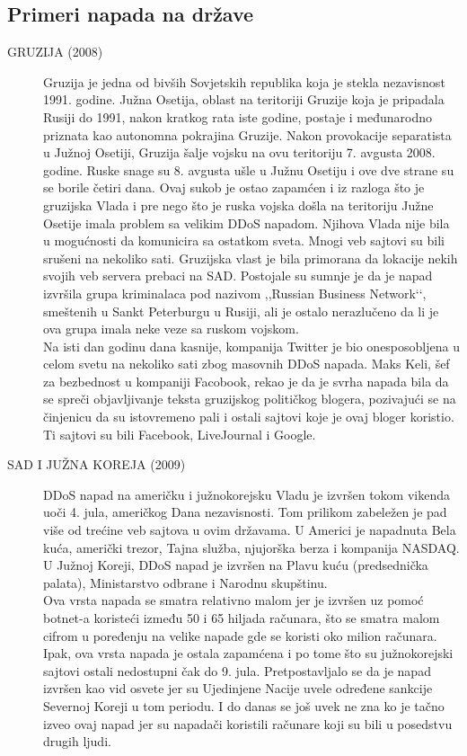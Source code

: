 \documentclass[a4paper]{article}
\theoremstyle{break}
\begin{document}
{\subsection{Primeri napada na države}
\label{subsec:primeri_napada_drzave}

\begin{description}
\item [GRUZIJA (2008)] Gruzija je jedna od bivših Sovjetskih republika koja je stekla nezavisnost 1991. godine. Južna Osetija, oblast na teritoriji Gruzije koja je pripadala Rusiji do 1991, nakon kratkog rata iste godine, postaje i međunarodno priznata kao autonomna pokrajina Gruzije. Nakon provokacije separatista u Južnoj Osetiji, Gruzija šalje vojsku na ovu teritoriju 7. avgusta 2008. godine. Ruske snage su 8. avgusta ušle u Južnu Osetiju i ove dve strane su se borile četiri dana. Ovaj sukob je ostao zapamćen i iz razloga što je gruzijska Vlada i pre nego što je ruska vojska došla na teritoriju Južne Osetije imala problem sa velikim DDoS napadom. Njihova Vlada nije bila u mogućnosti da komunicira sa ostatkom sveta. Mnogi veb sajtovi su bili srušeni na nekoliko sati. Gruzijska vlast je bila primorana da lokacije nekih svojih veb servera prebaci na SAD. Postojale su sumnje je da je napad izvršila grupa kriminalaca pod nazivom ,,Russian Business Network‘‘, smeštenih u Sankt Peterburgu u Rusiji, ali je ostalo nerazlučeno da li je ova grupa imala neke veze sa ruskom vojskom.
\\Na isti dan godinu dana kasnije, kompanija Twitter je bio onesposobljena u celom svetu na nekoliko sati zbog masovnih DDoS napada. Maks Keli, šef za bezbednost u kompaniji Facobook, rekao je da je svrha napada bila da se spreči objavljivanje teksta gruzijskog političkog blogera, pozivajući se na činjenicu da su istovremeno pali i ostali sajtovi koje je ovaj bloger koristio. Ti sajtovi su bili Facebook, LiveJournal i Google.     
\item [SAD I JUŽNA KOREJA (2009)] DDoS napad na američku i \linebreak južnokorejsku Vladu je izvršen tokom vikenda uoči 4. jula, američkog Dana nezavisnosti. Tom prilikom zabeležen je pad više od trećine veb sajtova u ovim državama. U Americi je napadnuta Bela kuća, američki trezor, Tajna služba, njujorška berza i kompanija NASDAQ. U Južnoj Koreji, DDoS napad je izvršen na Plavu kuću (predsednička palata), Ministarstvo odbrane i Narodnu skupštinu.
\\Ova vrsta napada se smatra relativno malom jer je izvršen uz pomoć botnet-a koristeći između 50 i 65 hiljada računara, što se smatra malom cifrom u poređenju na velike napade gde se koristi oko milion računara. Ipak, ova vrsta napada je ostala zapamćena i po tome što su južnokorejski sajtovi ostali nedostupni čak do 9. jula. Pretpostavljalo se da je napad izvršen kao vid osvete jer su Ujedinjene Nacije uvele određene sankcije Severnoj Koreji u tom periodu. I do danas se još uvek ne zna ko je tačno izveo ovaj napad jer su napadači koristili računare koji su bili u posedstvu drugih ljudi.    


\end{description}}
\end{document}
